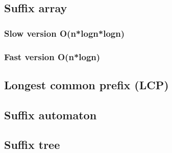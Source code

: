 \subsection{Suffix array}

\subsubsection{Slow version O(n*logn*logn)}


\subsubsection{Fast version O(n*logn)}


\subsection{Longest common prefix (LCP)}


\subsection{Suffix automaton}


\subsection{Suffix tree}

